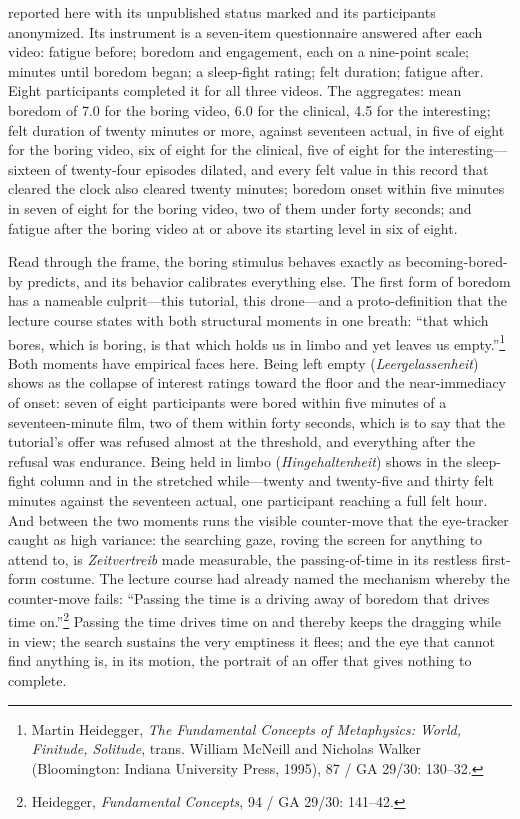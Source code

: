 reported here with its unpublished status marked and its participants anonymized. Its instrument is a seven-item questionnaire answered after each video: fatigue before; boredom and engagement, each on a nine-point scale; minutes until boredom began; a sleep-fight rating; felt duration; fatigue after. Eight participants completed it for all three videos. The aggregates: mean boredom of 7.0 for the boring video, 6.0 for the clinical, 4.5 for the interesting; felt duration of twenty minutes or more, against seventeen actual, in five of eight for the boring video, six of eight for the clinical, five of eight for the interesting---sixteen of twenty-four episodes dilated, and every felt value in this record that cleared the clock also cleared twenty minutes; boredom onset within five minutes in seven of eight for the boring video, two of them under forty seconds; and fatigue after the boring video at or above its starting level in six of eight.

Read through the frame, the boring stimulus behaves exactly as becoming-bored-by predicts, and its behavior calibrates everything else. The first form of boredom has a nameable culprit---this tutorial, this drone---and a proto-definition that the lecture course states with both structural moments in one breath: ``that which bores, which is boring, is that which holds us in limbo and yet leaves us empty.''\footnote{Martin Heidegger, \textit{The Fundamental Concepts of Metaphysics: World, Finitude, Solitude}, trans. William McNeill and Nicholas Walker (Bloomington: Indiana University Press, 1995), 87 / GA 29/30: 130--32.} Both moments have empirical faces here. Being left empty (\textit{Leergelassenheit}) shows as the collapse of interest ratings toward the floor and the near-immediacy of onset: seven of eight participants were bored within five minutes of a seventeen-minute film, two of them within forty seconds, which is to say that the tutorial's offer was refused almost at the threshold, and everything after the refusal was endurance. Being held in limbo (\textit{Hingehaltenheit}) shows in the sleep-fight column and in the stretched while---twenty and twenty-five and thirty felt minutes against the seventeen actual, one participant reaching a full felt hour. And between the two moments runs the visible counter-move that the eye-tracker caught as high variance: the searching gaze, roving the screen for anything to attend to, is \textit{Zeitvertreib} made measurable, the passing-of-time in its restless first-form costume. The lecture course had already named the mechanism whereby the counter-move fails: ``Passing the time is a driving away of boredom that drives time on.''\footnote{Heidegger, \textit{Fundamental Concepts}, 94 / GA 29/30: 141--42.} Passing the time drives time on and thereby keeps the dragging while in view; the search sustains the very emptiness it flees; and the eye that cannot find anything is, in its motion, the portrait of an offer that gives nothing to complete.

